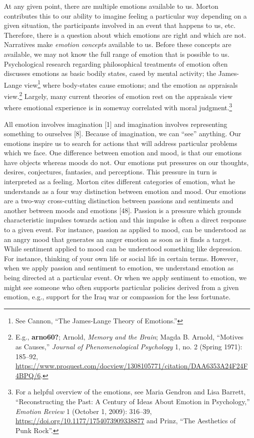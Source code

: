\documentclass[
  12pt,
]{book}
\theoremstyle{definition}
\theoremstyle{definition}
\theoremstyle{definition}
\theoremstyle{definition}
\theoremstyle{remark}
\begin{document}
At any given point, there are multiple emotions available to us. Morton contributes this to our ability to imagine feeling a particular way depending on a given situation, the participants involved in an event that happens to us, etc. Therefore, there is a question about which emotions are right and which are not. Narratives make \emph{emotion concepts} available to us. Before these concepts are available, we may not know the full range of emotion that is possible to us. Psychological research regarding philosophical treatments of emotion often discusses emotions as basic bodily states, cased by mental activity; the James-Lange view\footnote{See Cannon, {``The {James-Lange} Theory of Emotions.''}} where body-states cause emotions; and the emotion as appraisals view.\footnote{E.g., \textbf{arno60?}; Arnold, \emph{Memory and the Brain}; Magda B. Arnold, {``Motives as Causes,''} \emph{Journal of Phenomenological Psychology} 1, no. 2 (Spring 1971): 185--92, \url{https://www.proquest.com/docview/1308105771/citation/DAA6353A24F24F4BPQ/6}.} Largely, many current theories of emotion rest on the appraisals view where emotional experience is in someway correlated with moral judgment.\footnote{For a helpful overview of the emotions, see Maria Gendron and Lisa Barrett, {``Reconstructing the {Past}: {A Century} of {Ideas About Emotion} in {Psychology},''} \emph{Emotion Review} 1 (October 1, 2009): 316--39, \url{https://doi.org/10.1177/1754073909338877} and Prinz, {``The {Aesthetics} of {Punk Rock}''}.}

All emotion involves imagination {[}1{]} and imagination involves representing something to ourselves {[}8{]}. Because of imagination, we can ``see'' anything. Our emotions inspire us to search for actions that will address particular problems which we face. One difference between emotion and mood, is that our emotions have objects whereas moods do not. Our emotions put pressures on our thoughts, desires, conjectures, fantasies, and perceptions. This pressure in turn is interpreted as a feeling. Morton cites different categories of emotion, what he understands as a four way distinction between emotion and mood. Our emotions are a two-way cross-cutting distinction between passions and sentiments and another between moods and emotions {[}48{]}. Passion is a pressure which grounds characteristic impulses towards action and this impulse is often a direct response to a given event. For instance, passion as applied to mood, can be understood as an angry mood that generates an anger emotion as soon as it finds a target. While sentiment applied to mood can be understood something like depression. For instance, thinking of your own life or social life in certain terms. However, when we apply passion and sentiment to emotion, we understand emotion as being directed at a particular event. Or when we apply sentiment to emotion, we might see someone who often supports particular policies derived from a given emotion, e.g., support for the Iraq war or compassion for the less fortunate.
\end{document}
